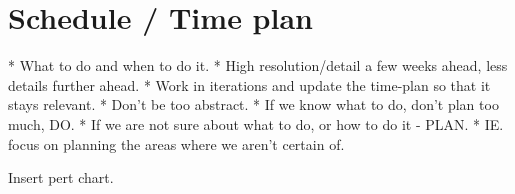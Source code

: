


\chapter{Schedule / Time plan}
* What to do and when to do it.
* High resolution/detail a few weeks ahead, less details further ahead.
* Work in iterations and update the time-plan so that it stays relevant.
* Don't be too abstract.
* If we know what to do, don't plan too much, DO.
* If we are not sure about what to do, or how to do it - PLAN.
* IE. focus on planning the areas where we aren't certain of.
 
Insert pert chart.


